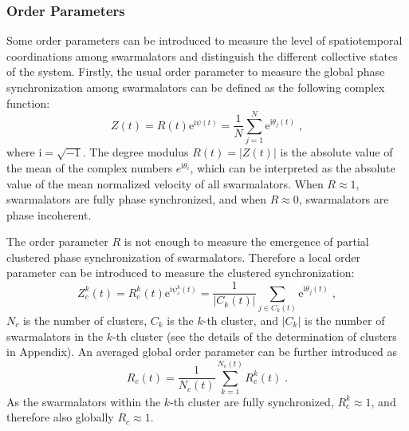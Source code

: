 \documentclass{article}
\begin{document}
\subsubsection{Order Parameters}
Some order parameters can be introduced to measure the level of spatiotemporal coordinations among swarmalators and distinguish the different collective states of the system. Firstly, the usual order parameter to measure the global phase synchronization among swarmalators can be defined as the following complex function:
\begin{equation}
    Z\left( t \right) =R\left( t \right) \mathrm{e}^{\textrm{i}\psi(t)}=\frac{1}{N}\sum_{j=1}^N{\mathrm{e}^{\textrm{i}\theta _j(t)}}\;,
\end{equation}
where $\textrm{i}=\sqrt{-1}$. The degree modulus $R(t)=\left|Z(t)\right|$ is the absolute value of the mean of the complex numbers $e^{\textrm{i}\theta _i}$, which can be interpreted as the absolute value of the mean normalized velocity of all swarmalators. When $R\approx 1$, swarmalators are fully phase synchronized, and when $R\approx0$, swarmalators are phase incoherent.

The order parameter $R$ is not enough to measure the emergence of partial clustered phase synchronization of swarmalators. Therefore a local order parameter can be introduced to measure the clustered synchronization:
\begin{equation}
    Z_c^k (t) = R_c^k \left( t \right) \mathrm{e}^{\textrm{i}\psi_c^k (t)} =  \frac{1}{\left| C_k\left( t \right) \right|}\sum_{j\in C_k\left( t \right)}{\mathrm{e}^{\mathrm{i}\theta _j\left( t \right)}} \;,
\end{equation}
$N_c$ is the number of clusters, $C_k$ is the $k$-th cluster, and $\left| C_k \right|$ is the number of swarmalators in the $k$-th cluster (see the details of the determination of clusters in Appendix). An averaged global order parameter can be further introduced as
\begin{equation}
    R_c\left( t \right) =\frac{1}{N_c\left( t \right)}\sum_{k=1}^{N_c\left( t \right)}{R^k_c (t)}\;.
\end{equation}
As the swarmalators within the $k$-th cluster are fully synchronized, $R_c^k\approx 1$, and therefore also globally $R_c\approx 1$.
\end{document}
